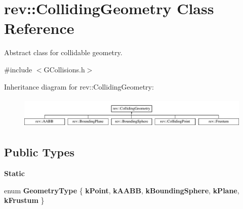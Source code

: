 \hypertarget{classrev_1_1_colliding_geometry}{}\section{rev\+::Colliding\+Geometry Class Reference}
\label{classrev_1_1_colliding_geometry}


Abstract class for collidable geometry.  




{\ttfamily \#include $<$G\+Collisions.\+h$>$}

Inheritance diagram for rev\+::Colliding\+Geometry\+:\begin{figure}[H]
\begin{center}
\leavevmode
\includegraphics[height=1.513514cm]{classrev_1_1_colliding_geometry}
\end{center}
\end{figure}
\subsection*{Public Types}
\begin{Indent}\textbf{ Static}\par
\begin{DoxyCompactItemize}
\item 
\mbox{\label{classrev_1_1_colliding_geometry_adada8ced179d4882290ff9c7fcb67930}} 
enum {\bfseries Geometry\+Type} \{ \newline
{\bfseries k\+Point}, 
{\bfseries k\+A\+A\+BB}, 
{\bfseries k\+Bounding\+Sphere}, 
{\bfseries k\+Plane}, 
\newline
{\bfseries k\+Frustum}
 \}
\end{DoxyCompactItemize}
\end{Indent}
